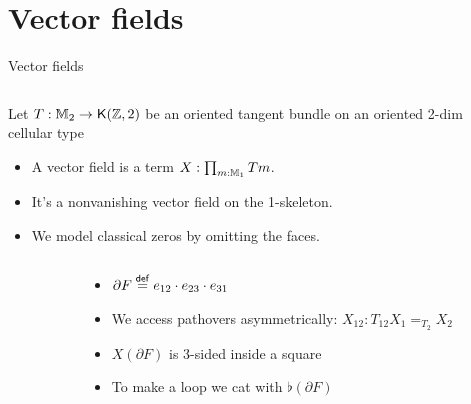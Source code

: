 \documentclass[14pt,aspectratio=169]{beamer}
\begin{document}
\section{Vector fields}
\begin{frame}{Vector fields}
\begin{columns}
\begin{column}{0.7\textwidth}
Let \( T:\mathbb{M}_2\to\mathsf{K}(\mathbb{Z},2) \) be an oriented tangent bundle on an oriented 2-dim cellular type
\begin{itemize}
\item A \alert{vector field} is a term \( X:\prod_{m:\mathbb{M}_1}Tm \).
\item It's a \alert{nonvanishing} vector field on the 1-skeleton.
\item We model classical zeros by omitting the faces.
\end{itemize}
\end{column}
\begin{column}{0.3\textwidth}

\end{column}
\end{columns}
\end{frame}

\begin{frame}
\begin{columns}
\begin{column}{0.6\textwidth}
\vspace{12pt}
\begingroup
{}

\endgroup
\end{column}
\begin{column}{0.4\textwidth}
\begin{itemize}
\item \( \partial F\stackrel{\mathsf{def}}{=} e_{12}\cdot e_{23}\cdot e_{31}  \)
\item We access pathovers asymmetrically: \( X_{12}:T_{12}X_1=_{T_2}X_2 \)
\item \( X(\partial F) \) is 3-sided inside a square
\item To make a loop we cat with \( \flat(\partial F) \)
\end{itemize}
\end{column}
\end{columns}
\end{frame}
\end{document}
